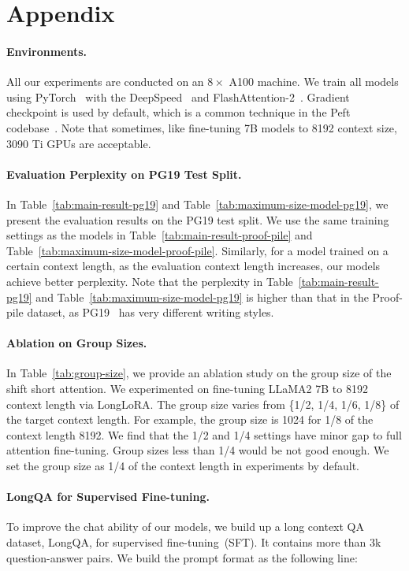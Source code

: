 \documentclass{article} %
\begin{document}
\section*{Appendix}
\paragraph{Environments.}
All our experiments are conducted on an $8\times$ A100 machine. We train all models using PyTorch~\citep{pytorch} with the DeepSpeed~\citep{deepspeed} and FlashAttention-2~\citep{flash-attention2}. Gradient checkpoint is used by default, which is a common technique in the Peft codebase~\cite{peft}. Note that sometimes, like fine-tuning 7B models to 8192 context size, 3090 Ti GPUs are acceptable.

\paragraph{Evaluation Perplexity on PG19 Test Split.}
In Table~\ref{tab:main-result-pg19} and Table~\ref{tab:maximum-size-model-pg19}, we present the evaluation results on the PG19 test split. We use the same training settings as the models in Table~\ref{tab:main-result-proof-pile} and Table~\ref{tab:maximum-size-model-proof-pile}. Similarly, for a model trained on a certain context length, as the evaluation context length increases, our models achieve better perplexity. Note that the perplexity in Table~\ref{tab:main-result-pg19} and Table~\ref{tab:maximum-size-model-pg19} is higher than that in the Proof-pile dataset, as PG19~\citep{pg19} has very different writing styles.

\paragraph{Ablation on Group Sizes.}
In Table~\ref{tab:group-size}, we provide an ablation study on the group size of the shift short attention. We experimented on fine-tuning LLaMA2 7B to 8192 context length via LongLoRA. The group size varies from \{1/2, 1/4, 1/6, 1/8\} of the target context length. For example, the group size is 1024 for 1/8 of the context length 8192. We find that the 1/2 and 1/4 settings have minor gap to full attention fine-tuning. Group sizes less than 1/4 would be not good enough. We set the group size as 1/4 of the context length in experiments by default.

\paragraph{LongQA for Supervised Fine-tuning.}
To improve the chat ability of our models, we build up a long context QA dataset, LongQA, for supervised fine-tuning~(SFT). It contains more than 3k question-answer pairs. We build the prompt format as the following line:
\end{document}
